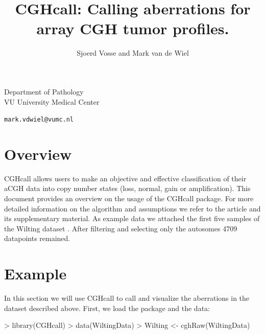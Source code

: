 \documentclass[11pt]{article}
\begin{document}

\title{\bf CGHcall: Calling aberrations for array CGH tumor profiles.}

\author{Sjoerd Vosse and Mark van de Wiel}

\maketitle

\begin{center}
Department of Pathology\\
VU University Medical Center
\end{center}

\begin{center}

{\tt mark.vdwiel@vumc.nl}
\end{center}


\tableofcontents

\section{Overview}

CGHcall allows users to make an objective and effective classification of their aCGH data into copy number states (loss, normal, gain or amplification). This document provides an overview on the usage of the CGHcall package. For more detailed information on the algorithm and assumptions we refer to the article \citep{CGHcall} and its supplementary material. As example data we attached the first five samples of the Wilting dataset \citep{Wilting}. After filtering and selecting only the autosomes 4709 datapoints remained.

\section{Example}

In this section we will use CGHcall to call and visualize the aberrations in the dataset described above. First, we load the package and the data:

\begin{Schunk}
\begin{Sinput}
> library(CGHcall)
> data(WiltingData)
> Wilting <- cghRaw(WiltingData)
\end{Sinput}
\end{Schunk}
\end{document}
